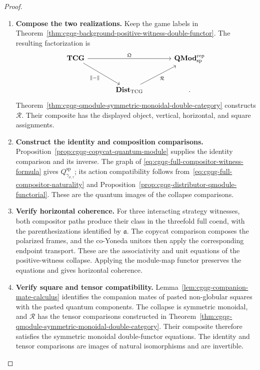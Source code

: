 \documentclass[oneside]{article}
\theoremstyle{plain}
\theoremstyle{definition}
\theoremstyle{remark}
\begin{document}
\begin{proof}
    \leavevmode
    \begin{enumerate}[beginpenalty=10000]
        \item \textbf{Compose the two realizations.}
        Keep the game labels in
        Theorem~\ref{thm:cgqg-background-positive-witness-double-functor}.
        The resulting factorization is
        \[
        \begin{tikzcd}[column sep=large,row sep=large]
        \mathbf{TCG}\arrow[rr,"\mathfrak Q"]
          \arrow[dr,"\lVert-\rVert"']
          &&\mathbf{QMod}^{\mathrm{rep}}_{\mathrm{sp}}\\
          &\mathbf{Dist}_{\mathrm{TCG}}
              \arrow[ur,"\mathcal R"']&.
        \end{tikzcd}
        \]
        Theorem~\ref{thm:cgqg-qmodule-symmetric-monoidal-double-category}
        constructs \(\mathcal R\). Their composite has the displayed
        object, vertical, horizontal, and square assignments.

        \item \textbf{Construct the identity and composition comparisons.}
        Proposition~\ref{prop:cgqg-copycat-quantum-module} supplies the
        identity comparison and its inverse. The graph of
        \eqref{eq:cgqg-full-compositor-witness-formula} gives
        \(Q_{\gamma_{\sigma,\tau}}^{\mathrm{sp}}\); its action compatibility
        follows from~\eqref{eq:cgqg-full-compositor-naturality} and
        Proposition~\ref{prop:cgqg-distributor-qmodule-functorial}.
        These are the quantum images of the collapse comparisons.

        \item \textbf{Verify horizontal coherence.}
        For three interacting strategy witnesses, both compositor
        paths produce their class in the threefold full coend, with
        the parenthesizations identified by \(\mathfrak a\).
        The copycat comparison composes the polarized frames, and
        the co-Yoneda unitors then apply the corresponding endpoint
        transport. These are the associativity and unit equations of
        the positive-witness collapse. Applying the module-map functor
        preserves the equations and gives horizontal coherence.

        \item \textbf{Verify square and tensor compatibility.}
        Lemma~\ref{lem:cgqg-companion-mate-calculus} identifies the
        companion mates of pasted non-globular squares with the pasted
        quantum components. The collapse is symmetric monoidal, and
        \(\mathcal R\) has the tensor comparisons constructed in
        Theorem~\ref{thm:cgqg-qmodule-symmetric-monoidal-double-category}.
        Their composite therefore satisfies the symmetric monoidal
        double-functor equations. The identity and tensor comparisons
        are images of natural isomorphisms and are invertible. \qedhere
    \end{enumerate}
\end{proof}
\end{document}
